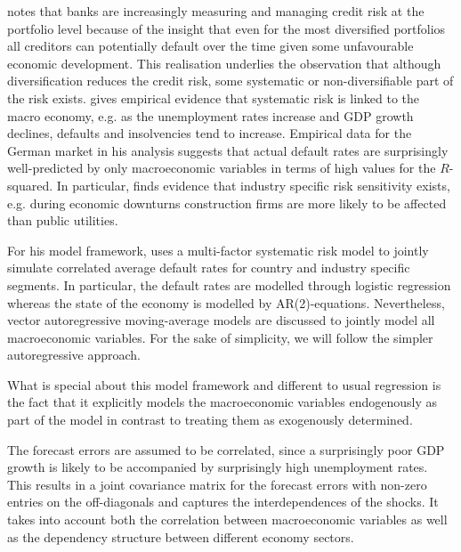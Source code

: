 \documentclass[a4paper, 12pt]{scrreprt}
\begin{document}
\textcite{wilson1998portfolio} notes that banks are increasingly measuring and managing credit risk at the portfolio level because of the insight that even for the most diversified portfolios all creditors can potentially default over the time given some unfavourable economic development. This realisation underlies the observation that although diversification reduces the credit risk, some systematic or non-diversifiable part of the risk exists. \textcite[chapter 3.3]{wilson1998measuring} gives empirical evidence that systematic risk is linked to the macro economy, e.g. as the unemployment rates increase and GDP growth declines, defaults and insolvencies tend to increase. Empirical data for the German market in his analysis suggests that actual default rates are surprisingly well-predicted by only macroeconomic variables in terms of high values for the $R$-squared. In particular, \textcite[chapter 3.4]{wilson1998measuring} finds evidence that industry specific risk sensitivity exists, e.g. during economic downturns construction firms are more likely to be affected than public utilities. 

For his model framework, \textcite{wilson1997wilsonI} uses a multi-factor systematic risk model to jointly simulate correlated average default rates for country and industry specific segments. In particular, the default rates are modelled through logistic regression whereas the state of the economy is modelled by AR(2)-equations. Nevertheless, vector \linebreak autoregressive moving-average models are discussed to jointly model all macroeconomic variables. For the sake of simplicity, we will follow the simpler autoregressive approach.

What is special about this model framework and different to usual regression is the fact that it explicitly models the macroeconomic variables endogenously as part of the model in contrast to treating them as exogenously determined.

The forecast errors are assumed to be correlated, since a surprisingly poor GDP growth is likely to be accompanied by surprisingly high unemployment rates. This results in a joint covariance matrix for the forecast errors with non-zero entries on the off-diagonals and captures the interdependences of the shocks. It takes into account both the correlation between macroeconomic variables as well as the dependency structure between different economy sectors.
\end{document}
